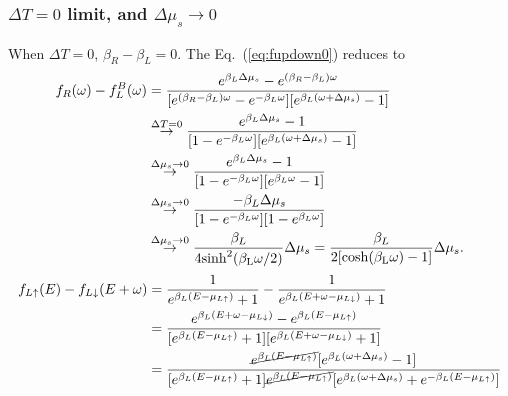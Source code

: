 \documentclass[aps,prb,superscriptaddress]{revtex4-2}
\begin{document}
\subsubsection{$\Delta T=0$ limit, and $\Delta\mu_s\to0$}
When $\Delta T = 0$, $\beta_{R} - \beta_{L} = 0$. The Eq.~(\ref{eq:fupdown0}) reduces to
\begin{equation}
\begin{split}
f_{R}(\omega)-f_{L}^{B}(\omega) & =\frac{e^{\beta_{L}\Delta\mu_{s}} - e^{(\beta_{R}-\beta_{L})\omega}}{[e^{(\beta_{R}-\beta_{L})\omega}-e^{-\beta_{L}\omega}][e^{\beta_{L}(\omega+\Delta\mu_{s})}-1]} \\
&\stackrel{\Delta T= 0}{\rightarrow} \frac{e^{\beta_{L}\Delta\mu_{s}} - 1}{ [1 - e^{-\beta_{L}\omega}][e^{\beta_{L}(\omega+\Delta\mu_{s})}-1]}\\
&\stackrel{\Delta \mu_s\to 0}{\rightarrow} \frac{e^{\beta_{L}\Delta\mu_{s}} - 1}{ [1 - e^{-\beta_{L}\omega}][e^{\beta_{L}\omega}-1]} \\
&\stackrel{\Delta \mu_s\to 0}{\rightarrow} \frac{-\beta_{L}\Delta\mu_{s}}{ [1 - e^{-\beta_{L}\omega}][1-e^{\beta_{L}\omega}]} \\
& \stackrel{\Delta \mu_s\to 0}{\rightarrow} \frac{\beta_{L}} {4\rm{sinh}^2(\beta_{L}\omega/2)} \Delta\mu_{s}= \frac{\beta_{L}} {2[\rm{cosh}(\beta_{L}\omega)-1]}\Delta\mu_{s}.
\end{split}
\end{equation}
\begin{equation}
\begin{split}
f_{L\uparrow}(E)-f_{L\downarrow}(E+\omega) &= \frac{1}{e^{\beta_{L}(E-\mu_{L\uparrow})}+1} - \frac{1}{e^{\beta_{L}(E+\omega-\mu_{L\downarrow})}+1} \\
&= \frac{e^{\beta_{L}(E+\omega-\mu_{L\downarrow})}- e^{\beta_{L}(E-\mu_{L\uparrow})}} {[e^{\beta_{L}(E-\mu_{L\uparrow})}+1] [e^{\beta_{L}(E+\omega-\mu_{L\downarrow})}+1]} \\
& = \frac{\cancel{e^{\beta_L(E-\mu_{L\uparrow})}} [e^{\beta_{L}(\omega+\Delta\mu_s)}- 1]} {[e^{\beta_{L}(E-\mu_{L\uparrow})}+1] \cancel{e^{\beta_L(E-\mu_{L\uparrow})}} [e^{\beta_{L}(\omega+\Delta\mu_s)}+e^{-\beta_L(E-\mu_{L\uparrow})}]}
\end{split}
\end{equation}
\end{document}
